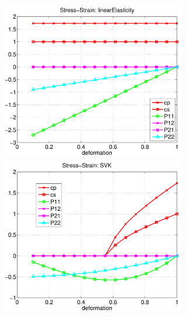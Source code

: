 {\newcommand{\graphWidth}{8cm}
\begin{figure}
\begin{center}
  \includegraphics[width=\graphWidth]{fig/linearElasticityStressStrain}
  \includegraphics[width=\graphWidth]{fig/SVKStressStrain}

\end{center}
\end{figure}}
